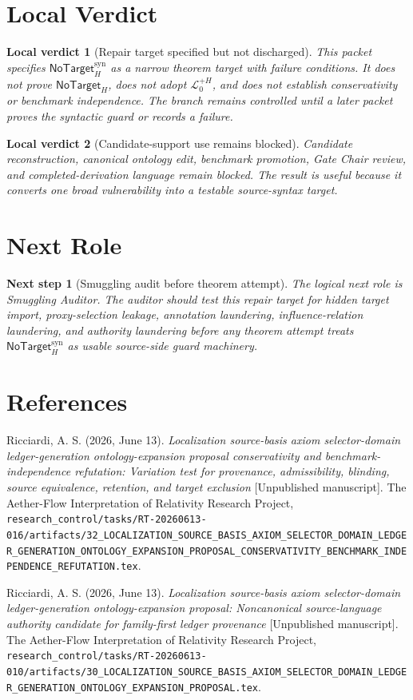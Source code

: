 \documentclass[11pt]{article}
\newcommand{\LangPlus}{\mathcal{L}_{0}^{+H}}
\newcommand{\NoTargetH}{\mathsf{NoTarget}_{H}}
\newcommand{\NoTargetSyn}{\mathsf{NoTarget}_{H}^{\mathrm{syn}}}
\newtheorem{verdict}{Local verdict}
\newtheorem{nextstep}{Next step}
\begin{document}
\section{Local Verdict}

\begin{verdict}[Repair target specified but not discharged]
This packet specifies \(\NoTargetSyn\) as a narrow theorem target with
failure conditions. It does not prove \(\NoTargetH\), does not adopt
\(\LangPlus\), and does not establish conservativity or benchmark
independence. The branch remains controlled until a later packet proves the
syntactic guard or records a failure.
\end{verdict}

\begin{verdict}[Candidate-support use remains blocked]
Candidate reconstruction, canonical ontology edit, benchmark promotion, Gate
Chair review, and completed-derivation language remain blocked. The result
is useful because it converts one broad vulnerability into a testable
source-syntax target.
\end{verdict}

\section{Next Role}

\begin{nextstep}[Smuggling audit before theorem attempt]
The logical next role is Smuggling Auditor. The auditor should test this
repair target for hidden target import, proxy-selection leakage, annotation
laundering, influence-relation laundering, and authority laundering before
any theorem attempt treats \(\NoTargetSyn\) as usable source-side guard
machinery.
\end{nextstep}

\section*{References}

Ricciardi, A. S. (2026, June 13). \emph{Localization source-basis axiom
selector-domain ledger-generation ontology-expansion proposal
conservativity and benchmark-independence refutation: Variation test for
provenance, admissibility, blinding, source equivalence, retention, and
target exclusion} [Unpublished manuscript]. The Aether-Flow Interpretation
of Relativity Research Project,
\texttt{research\_control/tasks/RT-20260613-016/artifacts/32\_LOCALIZATION\_SOURCE\_BASIS\_AXIOM\_SELECTOR\_DOMAIN\_LEDGER\_GENERATION\_ONTOLOGY\_EXPANSION\_PROPOSAL\_CONSERVATIVITY\_BENCHMARK\_INDEPENDENCE\_REFUTATION.tex}.

Ricciardi, A. S. (2026, June 13). \emph{Localization source-basis axiom
selector-domain ledger-generation ontology-expansion proposal: Noncanonical
source-language authority candidate for family-first ledger provenance}
[Unpublished manuscript]. The Aether-Flow Interpretation of Relativity
Research Project,
\texttt{research\_control/tasks/RT-20260613-010/artifacts/30\_LOCALIZATION\_SOURCE\_BASIS\_AXIOM\_SELECTOR\_DOMAIN\_LEDGER\_GENERATION\_ONTOLOGY\_EXPANSION\_PROPOSAL.tex}.
\end{document}
